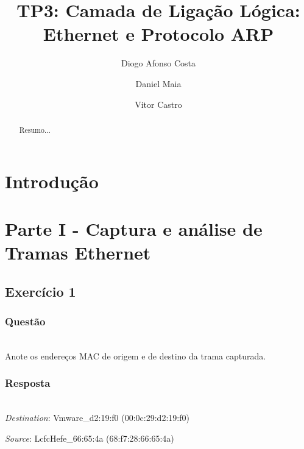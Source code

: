 \documentclass{llncs}
\begin{document}
\mainmatter
\title{TP3: Camada de Ligação Lógica: Ethernet e Protocolo ARP}


\author{Diogo Afonso Costa \and Daniel Maia \and Vitor Castro}



\date{}


\maketitle
\begin{abstract}
Resumo...
\end{abstract}

\section{Introdução}



\clearpage
\section{Parte I - Captura e análise de Tramas Ethernet}

\subsection{Exercício 1}
\subsubsection{Questão}\rule[-10pt]{0pt}{10pt}\\

Anote os endereços MAC de origem e de destino da trama capturada.

\subsubsection{Resposta}\rule[-10pt]{0pt}{10pt}\\

\textit{Destination}: Vmware\_d2:19:f0 (00:0c:29:d2:19:f0)

\textit{Source}: LcfcHefe\_66:65:4a (68:f7:28:66:65:4a)
\end{document}
